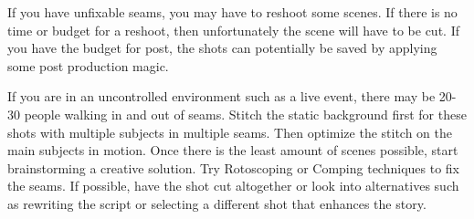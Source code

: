 \begin{fullwidth}
If you have unfixable seams, you may have to reshoot some scenes. If there is no time or budget for a reshoot, then unfortunately the scene will have to be cut. If you have the budget for post, the shots can potentially be saved by applying some post production magic. 

If you are in an uncontrolled environment such as a live event, there may be 20-30 people walking in and out of seams. Stitch the static background first for these shots with multiple subjects in multiple seams. Then optimize the stitch on the main subjects in motion. Once there is the least amount of scenes possible, start brainstorming a creative solution. Try Rotoscoping or Comping techniques to fix the seams. If possible, have the shot cut altogether or look into alternatives such as rewriting the script or selecting a different shot that enhances the story.

\clearpage
\end{fullwidth}